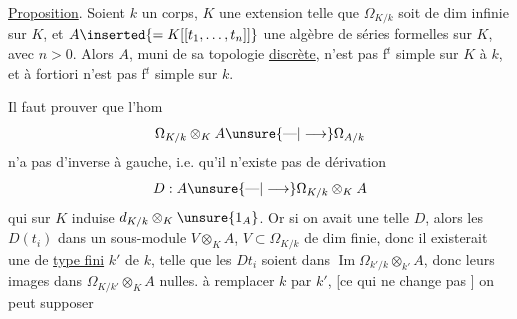 
\uline{Proposition}. Soient $k$ un corps, $K$ une extension
telle que $\Omega_{K/k}$ soit de dim infinie sur
$K$, et $A\inserted{=K[[t_1,\ldots,t_n]]}$ une algèbre de séries formelles
sur $K$, avec $n>0$. Alors $A$, muni de sa
topologie \uline{discrète}, n'est pas f$^t$ simple sur $K$
 à $k$, et à fortiori n'est pas f$^t$ simple sur $k$.

Il faut prouver que l'hom
\[
\Omega_{K/k}\otimes_K A\unsure{\text{---}|\longrightarrow}\Omega_{A/k}
\]
n'a pas d'inverse à gauche, i.e. qu'il
n'existe pas de dérivation
\[
D:A\unsure{\text{---}|\longrightarrow}\Omega_{K/k}\otimes_K A
\]
qui sur $K$ induise $d_{K/k}\otimes_K\unsure{1_A}$. Or
si on avait une telle $D$, alors les
$D(t_i)$  dans un sous-module
$V\otimes_K A$, $V\subset\Omega_{K/k}$ de dim finie, donc
il existerait une  de \uline{type fini}
$k'$ de $k$, telle que les $Dt_i$ soient dans
$\operatorname{Im}\Omega_{k'/k}\otimes_{k'}A$, donc leurs images dans
$\Omega_{K/k'}\otimes_K A$  nulles. 
à remplacer $k$ par $k'$, [ce qui
ne change pas ] on peut supposer


